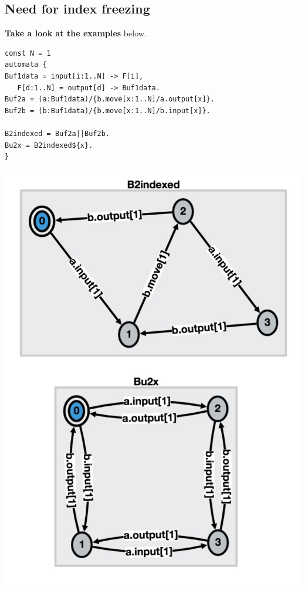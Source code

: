 \documentclass[]{article}
\begin{document}
\subsection{Need for index freezing }
{\color{red}

\begin{minipage}{0.55\textwidth}
{\bf Take a look at the examples} below.

\begin{verbatim}
const N = 1
automata {
Buf1data = input[i:1..N] -> F[i],
   F[d:1..N] = output[d] -> Buf1data.
Buf2a = (a:Buf1data)/{b.move[x:1..N]/a.output[x]}.
Buf2b = (b:Buf1data)/{b.move[x:1..N]/b.input[x]}.

B2indexed = Buf2a||Buf2b.
Bu2x = B2indexed${x}.
}
   \end{verbatim} 
\end{minipage}\begin{minipage}{0.35\textwidth}
\begin{center}\includegraphics[scale=0.17]{hideB.jpg}\end{center}
\end{minipage}

}
\end{document}
